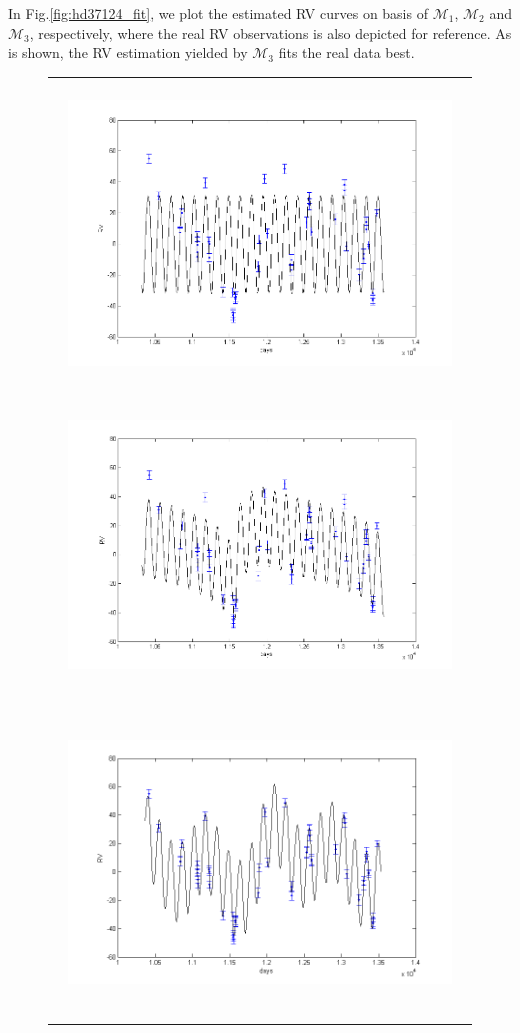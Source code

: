 \documentclass[aoas]{imsart}
\begin{document}
In Fig.\ref{fig:hd37124_fit}, we plot the estimated RV curves on
basis of $\mathcal{M}_1$, $\mathcal{M}_2$ and $\mathcal{M}_3$,
respectively, where the real RV observations is also depicted for
reference. As is shown, the RV estimation yielded by $\mathcal{M}_3$
fits the real data best.



\begin{figure}[!htb]
\begin{tabular}{c}
\centerline{\includegraphics[width=4in,height=3.2in]{Fig/hd37124_1p_fit.png}\includegraphics[width=4in,height=3.2in]{Fig/hd37124_2p_fit.png}}\\
\centerline{\includegraphics[width=4in,height=3.2in]{Fig/hd37124_3p_fit.png}}

\end{tabular}
\end{figure}
\end{document}
